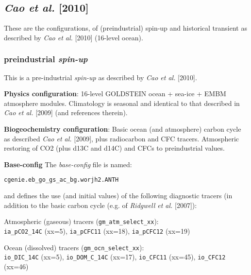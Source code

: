 \documentclass[10pt,twoside]{article}
\begin{document}

\subsection{\textit{Cao et al. }[2010]}

These are the configurations, of (preindustrial) spin-up and historical transient as described by \textit{Cao et al. }[2010] (16-level ocean).


\subsubsection{preindustrial \textit{spin-up}}\label{EXAMPLE.worjh2.Caoetal2009.SPIN}

This is a pre-industrial \textit{spin-up} as described by \textit{Cao et al. }[2010].

\noindent \textbf{Physics configuration}: 16-level GOLDSTEIN ocean + sea-ice + EMBM atmosphere modules. Climatology is seasonal and identical to that described in \textit{Cao et al.} [2009] (and references therein).

\noindent \textbf{Biogeochemistry configuration}: Basic ocean (and atmosphere) carbon cycle as described \textit{Cao et al.} [2009], plus radiocarbon and CFC tracers. Atmospheric restoring of CO2 (plus d13C and d14C) and CFCs to preindustrial values.

\noindent \textbf{Base-config} The \textit{base-config} file is named:
\vspace{-10pt}\begin{verbatim}cgenie.eb_go_gs_ac_bg.worjh2.ANTH\end{verbatim}\vspace{-10pt}
and defines the use (and initial values) of the following diagnostic tracers (in addition to the basic carbon cycle (e.g. of \textit{Ridgwell et al.} [2007]):

\begin{compactenum}

        \item Atmospheric (gaseous) tracers (\texttt{gm\_atm\_select\_xx}):
        \\\texttt{ia\_pCO2\_14C} (xx=5), \texttt{ia\_pCFC11} (xx=18), \texttt{ia\_pCFC12} (xx=19)
        \item Ocean (dissolved) tracers (\texttt{gm\_ocn\_select\_xx}):
        \\\texttt{io\_DIC\_14C} (xx=5), \texttt{io\_DOM\_C\_14C} (xx=17), \texttt{io\_CFC11} (xx=45), \texttt{io\_CFC12} (xx=46)
        
\end{compactenum}
\end{document}
